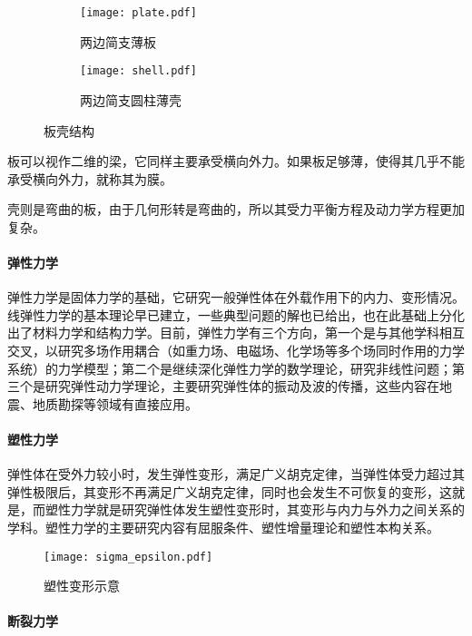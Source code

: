 \begin{figure}[h]
    \centering
    \begin{subfigure}[t]{0.4\textwidth} \centering
        \texttt{[image: plate.pdf]}
        \caption{两边简支薄板}
    \end{subfigure}\quad
    \begin{subfigure}[t]{0.4\textwidth} \centering
        \texttt{[image: shell.pdf]}
        \caption{两边简支圆柱薄壳}
    \end{subfigure}\bigskip
    \caption{板壳结构}
\end{figure}

\begin{marginpartext}
        板可以视作二维的梁，它同样主要承受横向外力。如果板足够薄，使得其几乎不能承受横向外力，就称其为膜。

        壳则是弯曲的板，由于几何形转是弯曲的，所以其受力平衡方程及动力学方程更加复杂。
\end{marginpartext}

\paragraph{弹性力学}

弹性力学是固体力学的基础，它研究一般弹性体在外载作用下的内力、变形情况。线弹性力学的基本理论早已建立，一些典型问题的解也已给出，也在此基础上分化出了材料力学和结构力学。目前，弹性力学有三个方向，第一个是与其他学科相互交叉，以研究多场作用耦合（如重力场、电磁场、化学场等多个场同时作用的力学系统）的力学模型；第二个是继续深化弹性力学的数学理论，研究非线性问题；第三个是研究弹性动力学理论，主要研究弹性体的振动及波的传播，这些内容在地震、地质勘探等领域有直接应用。

\paragraph{塑性力学}弹性体在受外力较小时，发生弹性变形，满足广义胡克定律，当弹性体受力超过其弹性极限后，其变形不再满足广义胡克定律，同时也会发生不可恢复的变形，这就是，而塑性力学就是研究弹性体发生塑性变形时，其变形与内力与外力之间关系的学科。塑性力学的主要研究内容有屈服条件、塑性增量理论和塑性本构关系。

\begin{figure}[h]
    \centering
    \texttt{[image: sigma\_epsilon.pdf]}
    \caption{塑性变形示意}
\end{figure}

\paragraph{断裂力学}

